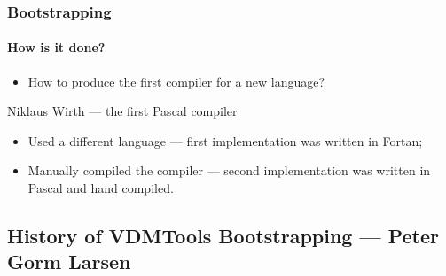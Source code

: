 \documentclass[slidestop,uncompress,mathserif,final]{beamer}
\newcommand{\pgl}[0]{Peter Gorm Larsen}
\begin{document}
\begin{frame}[t]
  \frametitle{Bootstrapping}
  \framesubtitle{How is it done?}

  \pause
  \begin{itemize}
	\item How to produce the first \alert{compiler} for a new \alert{language}?
  \end{itemize}

  \vspace{\fill}

  \pause
  \begin{block}{Niklaus Wirth --- the first Pascal compiler}
  \begin{itemize}
	\itemsep=.5cm
	\item Used a \alert{different language}  --- first implementation was written in Fortan;
	  \pause
	\item \alert{Manually compiled} the compiler --- second implementation was written in Pascal and hand compiled.
  \end{itemize}
  \end{block}
\end{frame}

\subsection[VDMTools]{History of VDMTools Bootstrapping --- \pgl~\cite{Larsen01}} 
\label{sec:vdmtools}
\end{document}
